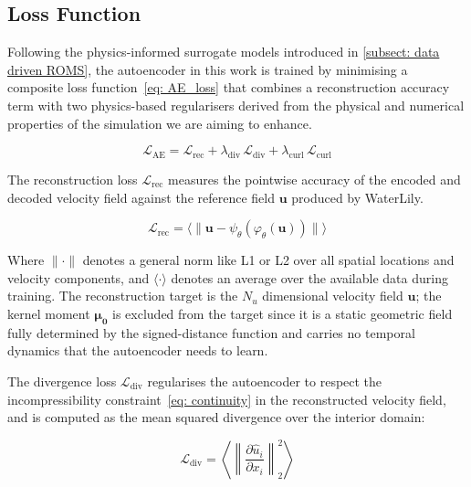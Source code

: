 \subsection{Loss Function}
\label{sect: AEloss}
Following the physics-informed surrogate models introduced in \autoref{subsect: data driven ROMS}, the autoencoder in this work is trained by minimising a composite loss function~\eqref{eq: AE_loss} that combines a reconstruction accuracy term with two physics-based regularisers derived from the physical and numerical properties of the simulation we are aiming to enhance. 

\begin{equation}\label{eq: AE_loss}
    \mathcal{L}_\text{AE} 
    = \mathcal{L}_\text{rec} 
    + \lambda_\text{div}\,\mathcal{L}_\text{div} 
    + \lambda_\text{curl}\,\mathcal{L}_\text{curl}
\end{equation}

The reconstruction loss $\mathcal{L}_\text{rec}$ measures the pointwise accuracy of the encoded and decoded velocity field against the reference field $\mathbf{u}$ produced by WaterLily.

\begin{equation}\label{eq: rec_loss}
    \mathcal{L}_\text{rec}
    = \bigl\langle
        \bigl\| \mathbf{u} - \psi_\theta(\varphi_\theta(\mathbf{u})) \bigr\|
      \bigr\rangle
\end{equation}

Where $\|\cdot\|$ denotes a general norm like L1 or L2 over all spatial locations and velocity components, and $\langle \cdot \rangle$ denotes an average over the available data during training. The reconstruction target is the $N_u$ dimensional velocity field $\mathbf{u}$; the kernel moment $\boldsymbol{\mu_0}$ is excluded from the target since it is a static geometric field fully determined by the signed-distance function and carries no temporal dynamics that the autoencoder needs to learn.

The divergence loss $\mathcal{L}_\text{div}$ regularises the autoencoder to respect the incompressibility constraint~\ref{eq: continuity} in the reconstructed velocity field, and is computed as the mean squared divergence over the interior domain: 

\begin{equation}\label{eq: div_loss}
    \mathcal{L}_\text{div}
    = \left\langle
        \left\| \frac{\partial \hat{u}_i}{\partial x_i} \right\|_2^2
      \right\rangle
\end{equation}

